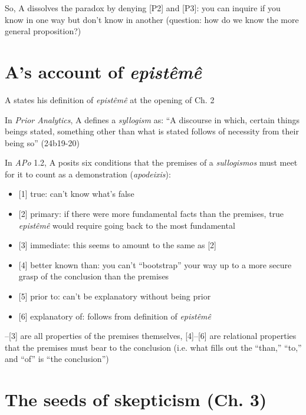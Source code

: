 \documentclass[11pt]{article}
\begin{document}
\noindent So, A dissolves the paradox by denying [P2] and [P3]: you can inquire if you know in one way but don't know in another (question: how do we know the more general proposition?)

\section*{A's account of \emph{epist\^{e}m\^{e}}}

\noindent A states his definition of \emph{epist\^{e}m\^{e}} at the opening of Ch. 2
\vspace*{2mm}

\noindent In \emph{Prior Analytics}, A defines a \emph{syllogism} as: ``A discourse in which, certain things beings stated, something other than what is stated follows of necessity from their being so'' (24b19-20)
\vspace*{2mm}

\noindent In \emph{APo} 1.2, A posits six conditions that the premises of a \emph{sullogismos} must meet for it to count as a demonstration (\emph{apodeixis}):

\begin{itemize}\item{[1] true: can't know what's false}\item{[2] primary: if there were more fundamental facts than the premises, true \emph{epist\^{e}m\^{e}} would require going back to the most fundamental}\item{[3] immediate: this seems to amount to the same as [2]}\item{[4] better known than: you can't ``bootstrap'' your way up to a more secure grasp of the conclusion than the premises}\item{[5] prior to: can't be explanatory without being prior}\item{[6] explanatory of: follows from definition of \emph{epist\^{e}m\^{e}}}\end{itemize}

\noindent [1]--[3] are all properties of the premises themselves, [4]--[6] are relational properties that the premises must bear to the conclusion (i.e. what fills out the ``than,'' ``to,'' and ``of'' is ``the conclusion'')
\vspace*{2mm}

\section*{The seeds of skepticism (Ch. 3)}
\end{document}
